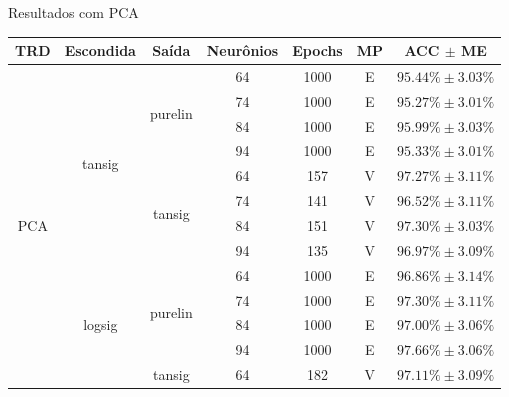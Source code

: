 \begin{frame}{Resultados com PCA}
	\footnotesize
        \begin{tabularx}{\linewidth}{| c | c | c | c | c | c | c |}
                \toprule
                TRD & Escondida & Saída & Neurônios & Epochs & MP & ACC $\pm$ ME\\
                \midrule
                \endhead
                \multirow{16}{*}{PCA} & \multirow{8}{*}{tansig} & \multirow{4}{*}{purelin} & 64 & 1000 & E & $95.44\% \pm 3.03\%$\\
                                      &                         &                          & 74 & 1000 & E & $95.27\% \pm 3.01\%$\\
                                      &                         &                          & 84 & 1000 & E & $95.99\% \pm 3.03\%$\\
                                      &                         &                          & 94 & 1000 & E & $95.33\% \pm 3.01\%$\\\cline{3-7}
                                      &                         & \multirow{4}{*}{tansig}  & 64 & 157 & V & $97.27\% \pm 3.11\%$\\*
                                      &                         &                          & 74 & 141 & V & $96.52\% \pm 3.11\%$\\*
                                      &                         &                          & 84 & 151 & V & $97.30\% \pm 3.03\%$\\*
                                      &                         &                          & 94 & 135 & V & $96.97\% \pm 3.09\%$\\\cline{2-7}
                                      & \multirow{8}{*}{logsig} & \multirow{4}{*}{purelin} & 64 & 1000 & E & $96.86\% \pm 3.14\%$\\*
                                      &                         &                          & 74 & 1000 & E & $97.30\% \pm 3.11\%$\\*
                                      &                         &                          & 84 & 1000 & E & $97.00\% \pm 3.06\%$\\*
                                      &                         &                          & 94 & 1000 & E & $97.66\% \pm 3.06\%$\\*\cline{3-7}
                                      &                         & \multirow{4}{*}{tansig}  & 64 & 182 & V & $97.11\% \pm 3.09\%$\\

\end{tabularx}
\end{frame}
